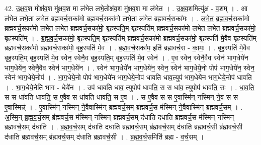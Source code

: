 \documentclass[17pt]{extarticle}
\begin{document}
42. उ॒क्ष॒व॒श मोक्ष॑व॒श मु॑क्षव॒श मा ल॑भेत लभे॒तोक्ष॑व॒श मु॑क्षव॒श मा ल॑भेत । . उ॒क्ष॒व॒शमित्यु॑क्ष - व॒शम् । . आ ल॑भेत लभे॒ता ल॑भेत ब्रह्मवर्च॒सका॑मो ब्रह्मवर्च॒सका॑मो लभे॒ता ल॑भेत ब्रह्मवर्च॒सका॑मः । . ल॒भे॒त॒ ब्र॒ह्म॒व॒र्च॒सका॑मो ब्रह्मवर्च॒सका॑मो लभेत लभेत ब्रह्मवर्च॒सका॑मो॒ बृह॒स्पति॒म् बृह॒स्पति॑म् ब्रह्मवर्च॒सका॑मो लभेत लभेत ब्रह्मवर्च॒सका॑मो॒ बृह॒स्पति᳚म् । . ब्र॒ह्म॒व॒र्च॒सका॑मो॒ बृह॒स्पति॒म् बृह॒स्पति॑म् ब्रह्मवर्च॒सका॑मो ब्रह्मवर्च॒सका॑मो॒ बृह॒स्पति॑ मे॒वैव बृह॒स्पति॑म् ब्रह्मवर्च॒सका॑मो ब्रह्मवर्च॒सका॑मो॒ बृह॒स्पति॑ मे॒व । . ब्र॒ह्म॒व॒र्च॒सका॑म॒ इति॑ ब्रह्मवर्च॒स - का॒मः॒ । . बृह॒स्पति॑ मे॒वैव बृह॒स्पति॒म् बृह॒स्पति॑ मे॒व स्वेन॒ स्वेनै॒व बृह॒स्पति॒म् बृह॒स्पति॑ मे॒व स्वेन॑ । . ए॒व स्वेन॒ स्वेनै॒वैव स्वेन॑ भाग॒धेये॑न भाग॒धेये॑न॒ स्वेनै॒वैव स्वेन॑ भाग॒धेये॑न । . स्वेन॑ भाग॒धेये॑न भाग॒धेये॑न॒ स्वेन॒ स्वेन॑ भाग॒धेये॒नो पोप॑ भाग॒धेये॑न॒ स्वेन॒ स्वेन॑ भाग॒धेये॒नोप॑ । . भा॒ग॒धेये॒नो पोप॑ भाग॒धेये॑न भाग॒धेये॒नोप॑ धावति धाव॒त्युप॑ भाग॒धेये॑न भाग॒धेये॒नोप॑ धावति । . भा॒ग॒धेये॒नेति॑ भाग - धेये॑न । . उप॑ धावति धाव॒ त्युपोप॑ धावति॒ स स धा॑व॒ त्युपोप॑ धावति॒ सः । . धा॒व॒ति॒ स स धा॑वति धावति॒ स ए॒वैव स धा॑वति धावति॒ स ए॒व । . स ए॒वैव स स ए॒वास्मि॑न् नस्मिन् ने॒व स स ए॒वास्मिन्न्॑ । . ए॒वास्मि॑न् नस्मिन् ने॒वैवास्मि॑न् ब्रह्मवर्च॒सम् ब्र॑ह्मवर्च॒स म॑स्मिन् ने॒वैवास्मि॑न् ब्रह्मवर्च॒सम् । . अ॒स्मि॒न् ब्र॒ह्म॒व॒र्च॒सम् ब्र॑ह्मवर्च॒स म॑स्मिन् नस्मिन् ब्रह्मवर्च॒सम् द॑धाति दधाति ब्रह्मवर्च॒स म॑स्मिन् नस्मिन् ब्रह्मवर्च॒सम् द॑धाति । . ब्र॒ह्म॒व॒र्च॒सम् द॑धाति दधाति ब्रह्मवर्च॒सम् ब्र॑ह्मवर्च॒सम् द॑धाति ब्रह्मवर्च॒सी ब्र॑ह्मवर्च॒सी द॑धाति ब्रह्मवर्च॒सम् ब्र॑ह्मवर्च॒सम् द॑धाति ब्रह्मवर्च॒सी । . ब्र॒ह्म॒व॒र्च॒समिति॑ ब्रह्म - व॒र्च॒सम् । \newline
\pagebreak
{}
\end{document}
